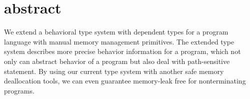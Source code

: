 \section{abstract}
\label{sec:abstraction}
We extend a behavioral type system with dependent types for a program
language with manual memory management primitives. The extended type system
describes more precise behavior information for a program, which not
only can abstract behavior of a program but also deal with
path-sensitive statement. By using our current type system with
another safe memory deallocation tools, we can even guarantee
memory-leak free for nonterminating programs.

 
